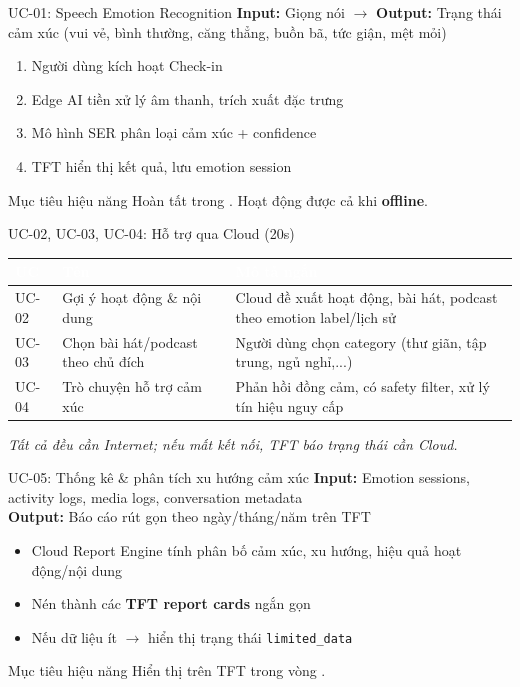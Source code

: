 \documentclass[12pt,aspectratio=169]{beamer}
\newcommand{\statpill}[2]{%
  \tikz[baseline=-0.6ex]{
    \node[draw=ecAccent,line width=1pt,rounded corners=6pt,fill=ecAccent!12,
          inner sep=4pt,font=\bfseries\scriptsize,text=ecPrimaryDk] {#1 #2};
  }%
}
\begin{document}
\begin{frame}{UC-01: Speech Emotion Recognition}
  \textbf{Input:} Giọng nói \quad $\rightarrow$ \quad \textbf{Output:} Trạng thái cảm xúc (vui vẻ, bình thường, căng thẳng, buồn bã, tức giận, mệt mỏi)
  \vspace{0.25cm}
  \begin{enumerate}
    \item Người dùng kích hoạt Check-in
    \item Edge AI tiền xử lý âm thanh, trích xuất đặc trưng
    \item Mô hình SER phân loại cảm xúc + confidence
    \item TFT hiển thị kết quả, lưu emotion session
  \end{enumerate}
  \begin{block}{Mục tiêu hiệu năng}
    Hoàn tất trong \statpill{15s}{}. Hoạt động được cả khi \textbf{offline}.
  \end{block}
\end{frame}

\begin{frame}{UC-02, UC-03, UC-04: Hỗ trợ qua Cloud (20s)}
  \small
  \begin{tabularx}{\textwidth}{L{1.5cm}L{3.5cm}Y}
  \toprule
  \textcolor{white}{\textbf{UC}} & \textcolor{white}{\textbf{Tên}} & \textcolor{white}{\textbf{Mô tả ngắn}} \\
  \midrule
  UC-02 & Gợi ý hoạt động \& nội dung & Cloud đề xuất hoạt động, bài hát, podcast theo emotion label/lịch sử \\
  UC-03 & Chọn bài hát/podcast theo chủ đích & Người dùng chọn category (thư giãn, tập trung, ngủ nghỉ,...) \\
  UC-04 & Trò chuyện hỗ trợ cảm xúc & Phản hồi đồng cảm, có safety filter, xử lý tín hiệu nguy cấp \\
  \bottomrule
  \end{tabularx}
  \vspace{0.2cm}
  \centering\small\color{ecInk!70}\textit{Tất cả đều cần Internet; nếu mất kết nối, TFT báo trạng thái cần Cloud.}
\end{frame}

\begin{frame}{UC-05: Thống kê \& phân tích xu hướng cảm xúc}
  \textbf{Input:} Emotion sessions, activity logs, media logs, conversation metadata \\
  \textbf{Output:} Báo cáo rút gọn theo ngày/tháng/năm trên TFT
  \vspace{0.25cm}
  \begin{itemize}
    \item Cloud Report Engine tính phân bố cảm xúc, xu hướng, hiệu quả hoạt động/nội dung
    \item Nén thành các \textbf{TFT report cards} ngắn gọn
    \item Nếu dữ liệu ít $\rightarrow$ hiển thị trạng thái \texttt{limited\_data}
  \end{itemize}
  \begin{block}{Mục tiêu hiệu năng}
    Hiển thị trên TFT trong vòng \statpill{180s}{}.
  \end{block}
\end{frame}
\end{document}
